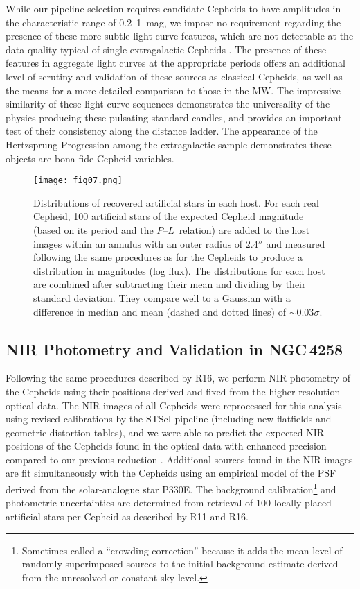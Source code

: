 \documentclass[12pt]{aastex631}
\newcommand{\PLs}{$P$--$L$\ }
\begin{document}
While our pipeline selection requires candidate Cepheids to have amplitudes in the characteristic range of 0.2--1~mag, we impose no requirement regarding the presence of these more subtle light-curve features, which are not detectable at the data quality typical of single extragalactic Cepheids \citep{Hoffmann:2016}.  The presence of these features in aggregate light curves at the appropriate periods offers an additional level of scrutiny and validation of these sources as classical Cepheids, as well as the means for a more detailed comparison to those in the MW.  The impressive similarity of these light-curve sequences demonstrates the universality of the physics producing these pulsating standard candles, and provides an important test of their consistency along the distance ladder.  The appearance of the Hertzsprung Progression among the extragalactic sample demonstrates these objects are bona-fide Cepheid variables.

\begin{figure}[b]
\texttt{[image: fig07.png]}
\caption{\label{fg:artstar} Distributions of recovered artificial stars in each host.  For each real Cepheid, 100 artificial stars of the expected Cepheid magnitude (based  on its period and the \PLs relation) are added to the host images within an annulus with an outer radius of $2.4''$ and measured following the same procedures as for the Cepheids to produce a distribution in magnitudes (log flux).  The distributions for each host are combined after subtracting their mean and dividing by their standard deviation.  They compare well to a Gaussian with a difference in median and mean (dashed and dotted lines) of $\sim 0.03\sigma$.  }
\end{figure}

\subsection{NIR Photometry and Validation in NGC$\,$4258\label{sc:3.3}}
   
Following the same procedures described by R16, we perform NIR photometry of the Cepheids using their positions derived and fixed from the higher-resolution optical data.  The NIR images of all Cepheids were reprocessed for this analysis using revised calibrations by the STScI pipeline (including new flatfields and geometric-distortion tables), and we were able to predict the expected NIR positions of the Cepheids found in the optical data with enhanced precision compared to our previous reduction \citep{Hoffmann:2016}. Additional sources found in the NIR images are fit simultaneously with the Cepheids using an empirical model of the PSF derived from the solar-analogue star P330E.  The background calibration\footnote{Sometimes called a ``crowding correction'' because it adds the mean level of randomly superimposed sources to the initial background estimate derived from the unresolved or constant sky level.} and photometric uncertainties are determined from retrieval of 100 locally-placed artificial stars per Cepheid as described by R11 and R16.
\end{document}
